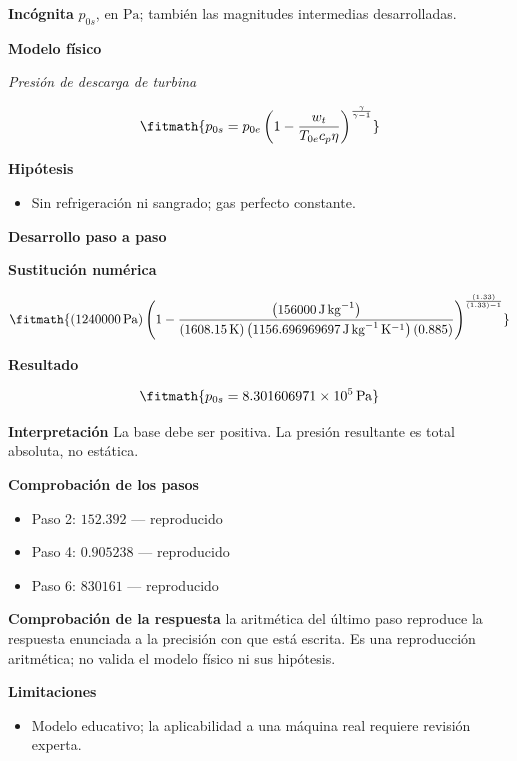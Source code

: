 \documentclass[10pt,openany]{book}
\begin{document}
\noindent\textbf{Incógnita}
$p_{0s}$, en $\mathrm{Pa}$; también las magnitudes intermedias desarrolladas.

\noindent\textbf{Modelo físico}

\noindent\textit{Presión de descarga de turbina}

\[
\fitmath{p_{0s}=p_{0e} \left(1 - \frac{w_t}{T_{0e} c_p \eta}\right)^{\frac{\gamma}{\gamma - 1}}}
\]

\noindent\textbf{Hipótesis}
\begin{itemize}
\item Sin refrigeración ni sangrado; gas perfecto constante.
\end{itemize}

\noindent\textbf{Desarrollo paso a paso}



\noindent\textbf{Sustitución numérica}

\[
\fitmath{\left(1240000\,\mathrm{Pa}\right) \left(1 - \frac{\left(156000\,\mathrm{J}\,\mathrm{kg}^{-1}\right)}{\left(1608.15\,\mathrm{K}\right) \left(1156.696969697\,\mathrm{J}\,\mathrm{kg}^{-1}\,\mathrm{K}^{-1}\right) \left(0.885\right)}\right)^{\frac{\left(1.33\right)}{\left(1.33\right) - 1}}}
\]

\noindent\textbf{Resultado}

\[
\fitmath{p_{0s}=8.301606971\times10^{5}\,\mathrm{Pa}}
\]

\noindent\textbf{Interpretación}
La base debe ser positiva. La presión resultante es total absoluta, no estática.

\noindent\textbf{Comprobación de los pasos}
\begin{itemize}
\item Paso 2: $152.392$ — reproducido
\item Paso 4: $0.905238$ — reproducido
\item Paso 6: $830161$ — reproducido
\end{itemize}

\noindent\textbf{Comprobación de la respuesta} la aritmética del último paso reproduce la respuesta enunciada a la precisión con que está escrita. Es una reproducción aritmética; no valida el modelo físico ni sus hipótesis.

\noindent\textbf{Limitaciones}
\begin{itemize}
\item Modelo educativo; la aplicabilidad a una máquina real requiere revisión experta.
\end{itemize}
\end{document}
